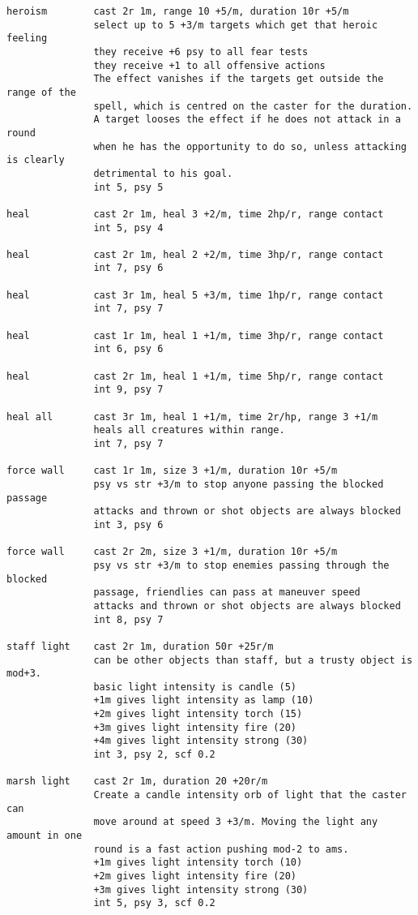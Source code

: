 \begin{verbatim}
heroism        cast 2r 1m, range 10 +5/m, duration 10r +5/m
               select up to 5 +3/m targets which get that heroic feeling
               they receive +6 psy to all fear tests
               they receive +1 to all offensive actions
               The effect vanishes if the targets get outside the range of the
               spell, which is centred on the caster for the duration.
               A target looses the effect if he does not attack in a round
               when he has the opportunity to do so, unless attacking is clearly
               detrimental to his goal.
               int 5, psy 5

heal           cast 2r 1m, heal 3 +2/m, time 2hp/r, range contact
               int 5, psy 4

heal           cast 2r 1m, heal 2 +2/m, time 3hp/r, range contact
               int 7, psy 6

heal           cast 3r 1m, heal 5 +3/m, time 1hp/r, range contact
               int 7, psy 7

heal           cast 1r 1m, heal 1 +1/m, time 3hp/r, range contact
               int 6, psy 6

heal           cast 2r 1m, heal 1 +1/m, time 5hp/r, range contact
               int 9, psy 7

heal all       cast 3r 1m, heal 1 +1/m, time 2r/hp, range 3 +1/m
               heals all creatures within range.
               int 7, psy 7

force wall     cast 1r 1m, size 3 +1/m, duration 10r +5/m
               psy vs str +3/m to stop anyone passing the blocked passage
               attacks and thrown or shot objects are always blocked
               int 3, psy 6

force wall     cast 2r 2m, size 3 +1/m, duration 10r +5/m
               psy vs str +3/m to stop enemies passing through the blocked
               passage, friendlies can pass at maneuver speed
               attacks and thrown or shot objects are always blocked
               int 8, psy 7

staff light    cast 2r 1m, duration 50r +25r/m
               can be other objects than staff, but a trusty object is mod+3.
               basic light intensity is candle (5)
               +1m gives light intensity as lamp (10)
               +2m gives light intensity torch (15)
               +3m gives light intensity fire (20)
               +4m gives light intensity strong (30)
               int 3, psy 2, scf 0.2

marsh light    cast 2r 1m, duration 20 +20r/m
               Create a candle intensity orb of light that the caster can
               move around at speed 3 +3/m. Moving the light any amount in one
               round is a fast action pushing mod-2 to ams.
               +1m gives light intensity torch (10)
               +2m gives light intensity fire (20)
               +3m gives light intensity strong (30)
               int 5, psy 3, scf 0.2


\end{verbatim}
